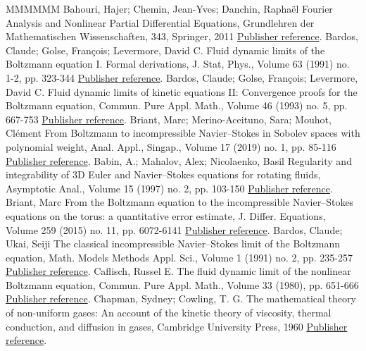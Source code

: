 \begin{thebibliography}{MMMMMM}
 Bahouri, Hajer; Chemin, Jean-Yves; Danchin, Raphaël Fourier Analysis and Nonlinear Partial Differential Equations, Grundlehren der Mathematischen Wissenschaften, 343, Springer, 2011 \href{https://ahl.centre-mersenne.org/item/AHL_2020__3__561_0/#BCD}{Publisher reference}.
 Bardos, Claude; Golse, François; Levermore, David C. Fluid dynamic limits of the Boltzmann equation I. Formal derivations, J. Stat, Phys., Volume 63 (1991) no. 1-2, pp. 323-344 \href{https://ahl.centre-mersenne.org/item/AHL_2020__3__561_0/#bgl1}{Publisher reference}.
 Bardos, Claude; Golse, François; Levermore, David C. Fluid dynamic limits of kinetic equations II: Convergence proofs for the Boltzmann equation, Commun. Pure Appl. Math., Volume 46 (1993) no. 5, pp. 667-753 \href{https://ahl.centre-mersenne.org/item/AHL_2020__3__561_0/#bgl2}{Publisher reference}.
 Briant, Marc; Merino-Aceituno, Sara; Mouhot, Clément From Boltzmann to incompressible Navier–Stokes in Sobolev spaces with polynomial weight, Anal. Appl., Singap., Volume 17 (2019) no. 1, pp. 85-116 \href{https://ahl.centre-mersenne.org/item/AHL_2020__3__561_0/#Briant-Mouhot-Merino}{Publisher reference}.
 Babin, A.; Mahalov, Alex; Nicolaenko, Basil Regularity and integrability of 3D Euler and Navier–Stokes equations for rotating fluids, Asymptotic Anal., Volume 15 (1997) no. 2, pp. 103-150 \href{https://ahl.centre-mersenne.org/item/AHL_2020__3__561_0/#BMN}{Publisher reference}.
 Briant, Marc From the Boltzmann equation to the incompressible Navier–Stokes equations on the torus: a quantitative error estimate, J. Differ. Equations, Volume 259 (2015) no. 11, pp. 6072-6141 \href{https://ahl.centre-mersenne.org/item/AHL_2020__3__561_0/#Briant}{Publisher reference}.
 Bardos, Claude; Ukai, Seiji The classical incompressible Navier–Stokes limit of the Boltzmann equation, Math. Models Methods Appl. Sci., Volume 1 (1991) no. 2, pp. 235-257 \href{https://ahl.centre-mersenne.org/item/AHL_2020__3__561_0/#Bardos-Ukai}{Publisher reference}.
 Caflisch, Russel E. The fluid dynamic limit of the nonlinear Boltzmann equation, Commun. Pure Appl. Math., Volume 33 (1980), pp. 651-666 \href{https://ahl.centre-mersenne.org/item/AHL_2020__3__561_0/#Caflisch}{Publisher reference}.
 Chapman, Sydney; Cowling, T. G. The mathematical theory of non-uniform gases: An account of the kinetic theory of viscosity, thermal conduction, and diffusion in gases, Cambridge University Press, 1960 \href{https://ahl.centre-mersenne.org/item/AHL_2020__3__561_0/#ChapEns}{Publisher reference}.

\end{thebibliography}
